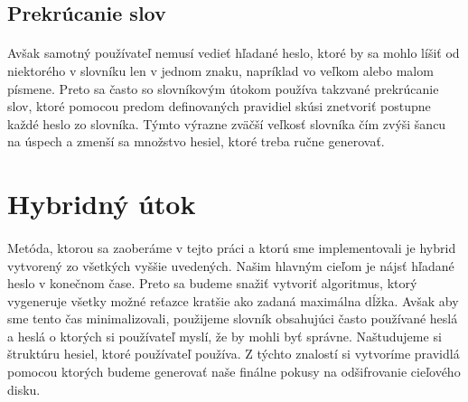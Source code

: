 \subsection{Prekrúcanie slov}
\paragraph{}
Avšak samotný používateľ nemusí vedieť hľadané heslo, ktoré by sa mohlo líšiť od niektorého v slovníku len v jednom znaku, napríklad vo veľkom alebo malom písmene. Preto sa často so slovníkovým útokom používa takzvané prekrúcanie slov, ktoré pomocou predom definovaných pravidiel skúsi znetvoriť postupne každé heslo zo slovníka. Týmto výrazne zväčší veľkosť slovníka čím zvýši šancu na úspech a zmenší sa množstvo hesiel, ktoré treba ručne generovať.

\section{Hybridný útok}
\paragraph{}
Metóda, ktorou sa zaoberáme v tejto práci a ktorú sme implementovali je hybrid vytvorený zo všetkých vyššie uvedených. Našim hlavným cieľom je nájsť hľadané heslo v konečnom čase. Preto sa budeme snažiť vytvoriť algoritmus, ktorý vygeneruje všetky možné reťazce kratšie ako zadaná maximálna dĺžka. Avšak aby sme tento čas minimalizovali, použijeme slovník obsahujúci často používané heslá a heslá o ktorých si používateľ myslí, že by mohli byť správne. Naštudujeme si štruktúru hesiel, ktoré používateľ používa. Z týchto znalostí si vytvoríme pravidlá pomocou ktorých budeme generovať naše finálne pokusy na odšifrovanie cieľového disku.